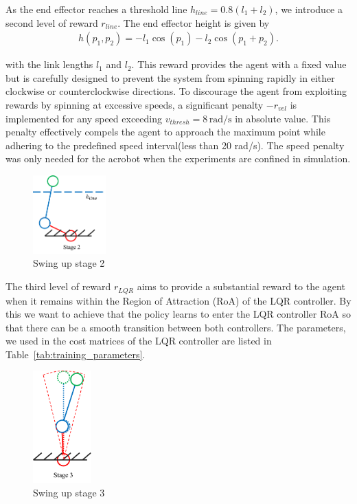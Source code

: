 As the end effector reaches a threshold line \(h_{line} = 0.8(l_1+l_2)\), we
introduce a second level of reward \(r_{line}\). The end effector height is
given by
\begin{align}
    h(p_1, p_2) = -l_1\cos(p_1) - l_2 \cos(p_1 + p_2).
\end{align}

with the link lengths $l_1$ and $l_2$.
This reward provides the agent with a fixed value
but is carefully designed to prevent the system from spinning rapidly in either
clockwise or counterclockwise directions. To discourage the agent from
exploiting rewards by spinning at excessive speeds, a significant penalty
\(-r_{vel}\) is implemented for any speed exceeding $v_{thresh}=8\,
\text{rad}/\text{s}$ in absolute value.
This penalty effectively compels the agent to approach the maximum point while
adhering to the predefined speed interval(less than 20 rad/s). The speed penalty was only needed for the acrobot when the experiments are confined in simulation.

\begin{figure}[H]
    \centering
    \includegraphics[width=0.25\textwidth]{figures/methodology/stage2.png} %
    \caption{Swing up stage 2}
    \label{fig:stage2} %
\end{figure}

The third level of reward $r_{LQR}$ aims to provide a substantial reward to the
agent when it remains within the Region of Attraction (RoA) of the LQR
controller. By this we want to achieve that the policy learns to enter the LQR
controller RoA so that there can be a smooth transition between both
controllers.  The parameters, we used in
the cost matrices of the LQR controller are listed in
Table~\ref{tab:training_parameters}. 

\begin{figure}[H]
    \centering
    \includegraphics[width=0.2\textwidth]{figures/methodology/stage3.png} %
    \caption{Swing up stage 3}
    \label{fig:stage3} %
\end{figure}


